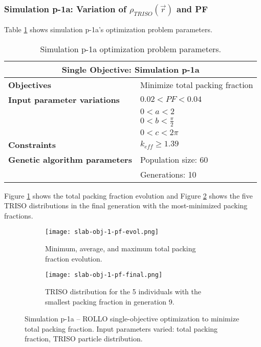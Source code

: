 \subsubsection{Simulation p-1a: Variation of $\rho_{TRISO}(\vec{r})$ and PF}
Table \ref{tab:simulationp1a} shows simulation p-1a's optimization problem parameters. 
\begin{table}[htbp]
    \centering
    \onehalfspacing
    \caption{Simulation p-1a optimization problem parameters.}
	\label{tab:simulationp1a}
    \footnotesize
    \begin{tabular}{l|p{5cm}}
    \hline 
    \multicolumn{2}{c}{\textbf{Single Objective: Simulation p-1a}} \\
    \hline 
    \textbf{Objectives} & Minimize total packing fraction \\
    \hline 
    \textbf{Input parameter variations} & $0.02<PF<0.04$ \\
    & $0<a<2$ \\
    & $0<b<\frac{\pi}{2}$ \\
    & $0<c<2\pi$ \\
    \hline
    \textbf{Constraints} & $k_{eff} \geq 1.39$\\ 
    \hline 
    \textbf{Genetic algorithm parameters} & Population size: 60 \\
    & Generations: 10 \\
    \hline
    \end{tabular}
\end{table}
Figure \ref{fig:slab-obj-1-pf-evol} shows the total packing fraction evolution and 
Figure \ref{fig:slab-obj-1-pf-final} shows the five TRISO distributions in 
the final generation with the most-minimized packing fractions. 
\begin{figure}[htbp]
    \centering
    \begin{subfigure}{\textwidth}
        \texttt{[image: slab-obj-1-pf-evol.png]}
        \caption{Minimum, average, and maximum total packing fraction evolution.}
        \label{fig:slab-obj-1-pf-evol} 
    \end{subfigure}
    \begin{subfigure}{\textwidth}
        \texttt{[image: slab-obj-1-pf-final.png]}
        \caption{TRISO distribution for the 5 individuals with the 
        smallest packing fraction in generation 9.}
        \label{fig:slab-obj-1-pf-final} 
    \end{subfigure}
    \caption{Simulation p-1a -- ROLLO single-objective optimization to minimize total 
    packing fraction. Input parameters varied: total packing fraction, TRISO particle 
    distribution.}
    \label{fig:slab-obj-1-pf}
\end{figure}
